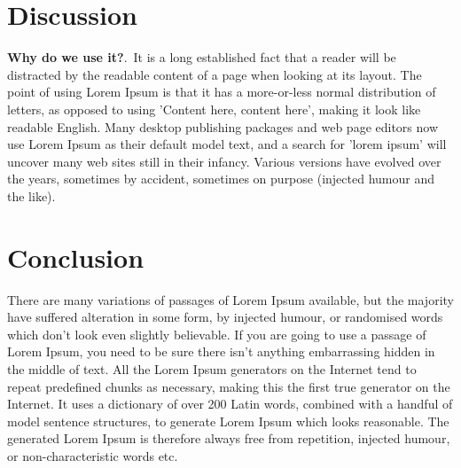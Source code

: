 \section{Discussion}
\label{app:discussion}

\textbf{ Why do we use it?}.\, It is a long established fact that a reader will be distracted by the readable content of a page when looking at its layout. The point of using Lorem Ipsum is that it has a more-or-less normal distribution of letters, as opposed to using 'Content here, content here', making it look like readable English. Many desktop publishing packages and web page editors now use Lorem Ipsum as their default model text, and a search for 'lorem ipsum' will uncover many web sites still in their infancy. Various versions have evolved over the years, sometimes by accident, sometimes on purpose (injected humour and the like).

\section{Conclusion}
There are many variations of passages of Lorem Ipsum available, but the majority have suffered alteration in some form, by injected humour, or randomised words which don't look even slightly believable. If you are going to use a passage of Lorem Ipsum, you need to be sure there isn't anything embarrassing hidden in the middle of text. All the Lorem Ipsum generators on the Internet tend to repeat predefined chunks as necessary, making this the first true generator on the Internet. It uses a dictionary of over 200 Latin words, combined with a handful of model sentence structures, to generate Lorem Ipsum which looks reasonable. The generated Lorem Ipsum is therefore always free from repetition, injected humour, or non-characteristic words etc.